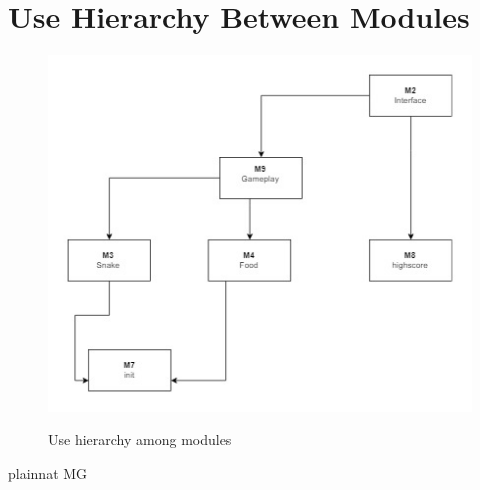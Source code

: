 \documentclass[12pt, titlepage]{article}
\begin{document}
\section{Use Hierarchy Between Modules} \label{SecUse}


\begin{figure}[H]
\centering
\caption{Use hierarchy among modules}
\includegraphics{Use_Heirarchy}
\label{FigUH}
\end{figure}


 {plainnat}
 {MG}
\end{document}
